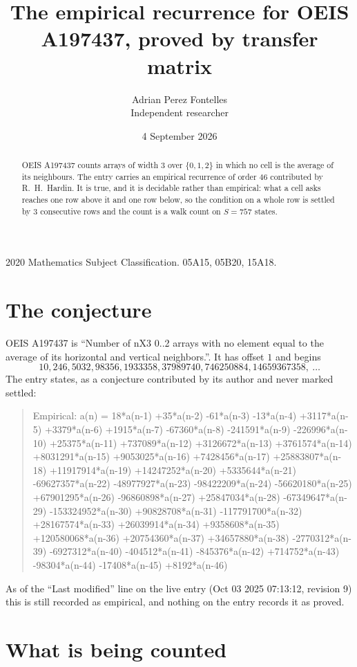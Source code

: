 \documentclass[11pt,a4paper]{article}
\title{The empirical recurrence for OEIS A197437, proved by transfer matrix}
\author{Adrian Perez Fontelles\\ \small Independent researcher}
\date{4 September 2026}
\theoremstyle{plain}
\theoremstyle{definition}
\begin{document}
\maketitle

\begin{abstract}
OEIS A197437 counts arrays of width $3$ over $\{0,1,2\}$ in which no cell is the average of its neighbours. The entry carries an
empirical recurrence of order $46$ contributed by R.~H.~Hardin. It is true, and it is
decidable rather than empirical: what a cell asks reaches one row above
it and one row below, so the condition on a whole row is settled by
$3$ consecutive rows and the count is a walk count on $S=757$ states.
\end{abstract}

\noindent\small 2020 Mathematics Subject Classification. 05A15, 05B20, 15A18.\normalsize

\section{The conjecture}

OEIS A197437 is ``Number of nX3 0..2 arrays with no element equal to the average of its horizontal and vertical neighbors.''. It has offset $1$ and begins
\[
10, 246, 5032, 98356, 1933358, 37989740, 746250884, 14659367358,\ \dots
\]
The entry states, as a conjecture contributed by its author and never marked settled:
\begin{quote}
Empirical: a(n) = 18*a(n-1) +35*a(n-2) -61*a(n-3) -13*a(n-4) +3117*a(n-5) +3379*a(n-6) +1915*a(n-7) -67360*a(n-8) -241591*a(n-9) -226996*a(n-10) +25375*a(n-11) +737089*a(n-12) +3126672*a(n-13) +3761574*a(n-14) +8031291*a(n-15) +9053025*a(n-16) +7428456*a(n-17) +25883807*a(n-18) +11917914*a(n-19) +14247252*a(n-20) +5335644*a(n-21) -69627357*a(n-22) -48977927*a(n-23) -98422209*a(n-24) -56620180*a(n-25) +67901295*a(n-26) -96860898*a(n-27) +25847034*a(n-28) -67349647*a(n-29) -153324952*a(n-30) +90828708*a(n-31) -117791700*a(n-32) +28167574*a(n-33) +26039914*a(n-34) +9358608*a(n-35) +120580068*a(n-36) +20754360*a(n-37) +34657880*a(n-38) -2770312*a(n-39) -6927312*a(n-40) -404512*a(n-41) -845376*a(n-42) +714752*a(n-43) -98304*a(n-44) -17408*a(n-45) +8192*a(n-46)
\end{quote}
As of the ``Last modified'' line on the live entry (Oct 03 2025 07:13:12, revision 9) this is still
recorded as empirical, and nothing on the entry records it as proved.

\section{What is being counted}
\end{document}

